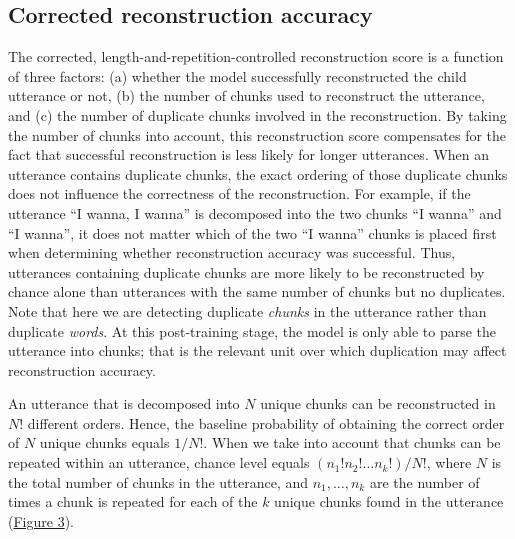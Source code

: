 \documentclass[
  english,
  man,floatsintext]{apa6}
\begin{document}
\hypertarget{corrected-reconstruction-accuracy}{%
\subsection{Corrected reconstruction accuracy}\label{corrected-reconstruction-accuracy}}

The corrected, length-and-repetition-controlled reconstruction score is a function of three factors: (a) whether the model successfully reconstructed the child utterance or not, (b) the number of chunks used to reconstruct the utterance, and (c) the number of duplicate chunks involved in the reconstruction. By taking the number of chunks into account, this reconstruction score compensates for the fact that successful reconstruction is less likely for longer utterances. When an utterance contains duplicate chunks, the exact ordering of those duplicate chunks does not influence the correctness of the reconstruction. For example, if the utterance \enquote{I wanna, I wanna} is decomposed into the two chunks \enquote{I wanna} and \enquote{I wanna}, it does not matter which of the two \enquote{I wanna} chunks is placed first when determining whether reconstruction accuracy was successful. Thus, utterances containing duplicate chunks are more likely to be reconstructed by chance alone than utterances with the same number of chunks but no duplicates. Note that here we are detecting duplicate \emph{chunks} in the utterance rather than duplicate \emph{words}. At this post-training stage, the model is only able to parse the utterance into chunks; that is the relevant unit over which duplication may affect reconstruction accuracy.

An utterance that is decomposed into \(N\) unique chunks can be reconstructed in \(N!\) different orders. Hence, the baseline probability of obtaining the correct order of \(N\) unique chunks equals \(1/N!\). When we take into account that chunks can be repeated within an utterance, chance level equals \((n_1!n_2!\ldots n_k!)/N!\), where \(N\) is the total number of chunks in the utterance, and \(n_1,\ldots,n_k\) are the number of times a chunk is repeated for each of the \(k\) unique chunks found in the utterance (\protect\hyperlink{fig3}{Figure 3}).
\end{document}
